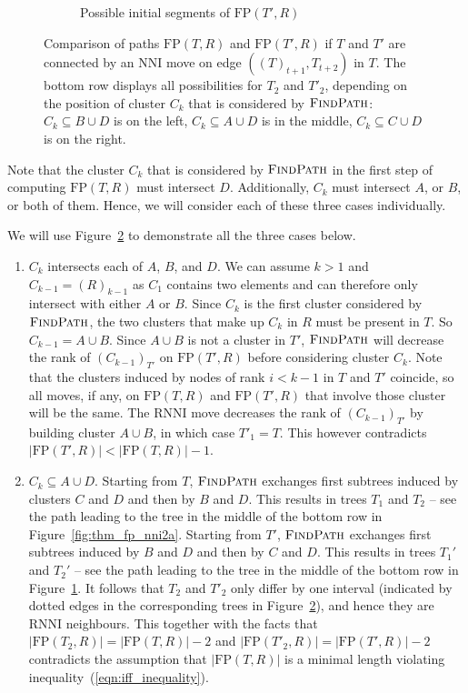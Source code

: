 \documentclass[11pt]{amsart}
\newcommand{\rnni}{\mathrm{RNNI}}
\newcommand{\findpath}{\textsc{FindPath}}
\newcommand{\nni}{\mathrm{NNI}}
\newcommand{\fp}{\mathrm{FP}}
\begin{document}
\begin{enumerate}[label = 1.{\arabic*}]
\begin{figure}[ht]
\begin{subfigure}[b]{.45\textwidth}
		\vspace{12pt}
		\caption{Possible initial segments of $\fp(T', R)$}
		\label{fig:thm_fp_nni2b}
	\end{subfigure}
	\caption{Comparison of paths $\fp(T, R)$ and $\fp(T', R)$ if $T$ and $T'$ are connected by an $\nni$ move on edge $((T)_{t+1},T_{t+2})$ in $T$.
	The bottom row displays all possibilities for $T_2$ and $T'_2$, depending on the position of cluster $C_k$ that is considered by $\findpath$:
	${C_k \subseteq B \cup D}$ is on the left, ${C_k \subseteq A \cup D}$ is in the middle, ${C_k \subseteq C \cup D}$ is on the right.}
	\label{fig:thm_fp_nni}
\end{figure}

Note that the cluster $C_k$ that is considered by $\findpath$ in the first step of computing $\fp(T, R)$ must intersect $D$.
Additionally, $C_k$ must intersect $A$, or $B$, or both of them.
Hence, we will consider each of these three cases individually.

We will use Figure~\ref{fig:thm_fp_nni} to demonstrate all the three cases below.

\begin{enumerate}[label = \theenumi.\arabic*]
\item $C_k$ intersects each of $A$, $B$, and $D$.
We can assume $k > 1$ and $C_{k-1} = (R)_{k-1}$ as $C_1$ contains two elements and can therefore only intersect with either $A$ or $B$.
Since $C_k$ is the first cluster considered by $\findpath$, the two clusters that make up $C_k$ in $R$ must be present in $T$.
So $C_{k-1} = A \cup B$.
Since $A \cup B$ is not a cluster in $T'$, $\findpath$ will decrease the rank of $(C_{k-1})_{T'}$ on $\fp(T', R)$ before considering cluster $C_k$.
Note that the clusters induced by nodes of rank $i < k - 1$ in $T$ and $T'$ coincide, so all moves, if any, on $\fp(T, R)$ and $\fp(T', R)$ that involve those cluster will be the same.
The $\rnni$ move decreases the rank of $(C_{k-1})_{T'}$ by building cluster $A \cup B$, in which case $T'_1 = T$.
This however contradicts $|\fp(T',R)| < |\fp(T,R)| - 1$.

\item $C_k \subseteq A \cup D$.
\label{deep_case_details}
Starting from $T$, $\findpath$ exchanges first subtrees induced by clusters $C$ and $D$ and then by $B$ and $D$.
This results in trees $T_1$ and $T_2$ -- see the path leading to the tree in the middle of the bottom row in Figure~\ref{fig:thm_fp_nni2a}.
Starting from $T'$, $\findpath$ exchanges first subtrees induced by $B$ and $D$ and then by $C$ and $D$.
This results in trees $T_1'$ and $T_2'$ -- see the path leading to the tree in the middle of the bottom row in Figure~\ref{fig:thm_fp_nni2b}.
It follows that $T_2$ and $T'_2$ only differ by one interval (indicated by dotted edges in the corresponding trees in Figure~\ref{fig:thm_fp_nni}), and hence they are $\rnni$ neighbours.
This together with the facts that $|\fp(T_2,R)| = |\fp(T,R)|-2$ and $|\fp(T'_2,R)| = |\fp(T',R)|-2$ contradicts the assumption that $|\fp(T,R)|$ is a minimal length violating inequality~(\ref{eqn:iff_inequality}).


\end{enumerate}
\end{enumerate}
\end{document}
